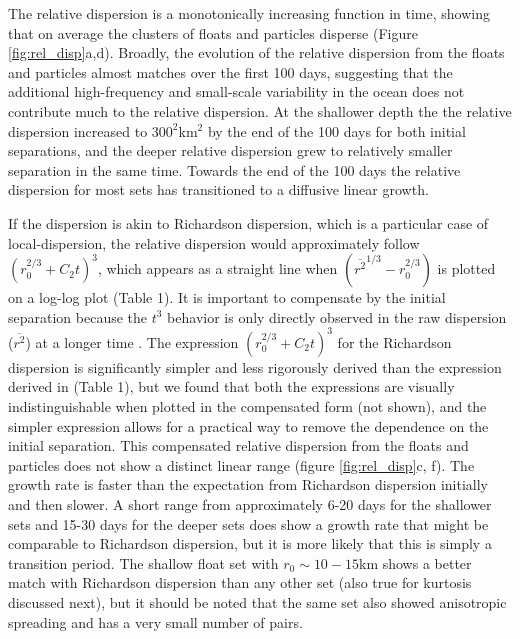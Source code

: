 \documentclass[]{ametsoc}
\begin{document}
The relative dispersion is a monotonically increasing function in time, showing that on average the clusters of floats and particles disperse (Figure \ref{fig:rel_disp}a,d). Broadly, the evolution of the relative dispersion from the floats and particles almost matches over the first 100 days, suggesting that the additional high-frequency and small-scale variability in the ocean does not contribute much to the relative dispersion. At the shallower depth the the relative dispersion increased to $300^2$km$^2$ by the end of the 100 days for both initial separations, and the deeper relative dispersion grew to relatively smaller separation in the same time. Towards the end of the 100 days the relative dispersion for most sets has transitioned to a diffusive linear growth.

If the dispersion is akin to Richardson dispersion, which is a particular case of local-dispersion, the relative dispersion would approximately follow $(r_0^{2/3} + C_2t)^3$, which appears as a straight line when $(\overline{r^2}^{1/3} - r_0^{2/3})$ is plotted on a log-log plot (Table 1). It is important to compensate by the initial separation because the $t^3$ behavior is only directly observed in the raw dispersion ($\overline{r^2}$) at a longer time \citep{babiano1990relative}. The expression $(r_0^{2/3} + C_2t)^3$ for the Richardson dispersion \citet{ollitrault2005open} is significantly simpler and less rigorously derived than the expression derived in \citet{graff2015relative} (Table 1), but we found that both the expressions are visually indistinguishable when plotted in the compensated form (not shown), and the simpler expression allows for a practical way to remove the dependence on the initial separation.
This compensated relative dispersion from the floats and particles does not show a distinct linear range (figure \ref{fig:rel_disp}c, f). The growth rate is faster than the expectation from Richardson dispersion initially and then slower. A short range from approximately 6-20 days for the shallower sets and 15-30 days for the deeper sets does show a growth rate that might be comparable to Richardson dispersion, but it is more likely that this is simply a transition period. The shallow float set with $r_0 \sim 10-15$km shows a better match with Richardson dispersion than any other set (also true for kurtosis discussed next), but it should be noted that the same set also showed anisotropic spreading and has a very small number of pairs.
\end{document}
